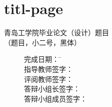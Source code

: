\chapter{titl-page}
\begin{center}
\xiaoerhao\heiti 青岛工学院毕业论文（设计）题目 \\
\xiaosihao\songti（题目，小二号，黑体）
\begin{figure}[!b]
\setlength{\baselineskip}{35pt}
\xiaosanhao
\begin{tabbing}
 \hspace{5cm}完成日期：\hspace{2cm} \= \unline[6cm]{} \\
 \hspace{5cm}指导教师签字： \> \unline[6cm]{} \\
 \hspace{5cm}评阅教师签字： \> \unline[6cm]{} \\
 \hspace{5cm}答辩小组长签字： \> \unline[6cm]{} \\
 \hspace{5cm}答辩小组成员签字： \> \unline[6cm]{} \\ \\ \\ 
\end{tabbing}
\end{figure}
\end{center}